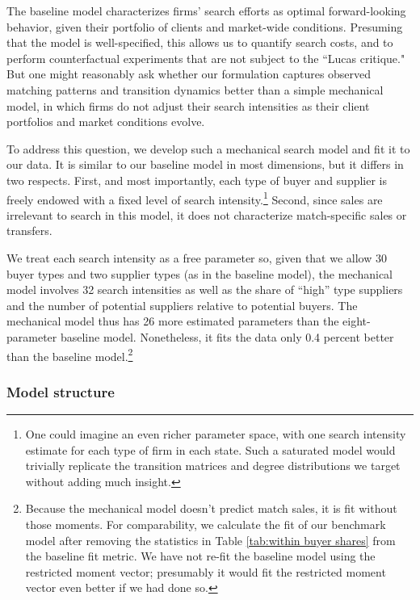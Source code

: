 \documentclass[12pt]{article} \usepackage{amsmath,amssymb,amsthm,geometry,graphicx,setspace,algorithm,algpseudocode,float}
\begin{document}
 The baseline model characterizes firms' search efforts as optimal forward-looking behavior, given their portfolio of clients and market-wide conditions. Presuming that the model is well-specified, this allows us to quantify search costs, and to perform counterfactual experiments that are not subject to the ``Lucas critique." But one might reasonably ask whether our formulation captures observed matching patterns and transition dynamics better than a simple mechanical model, in which firms do not adjust their search intensities as their client portfolios and market conditions evolve.  
\par
To address this question, we develop such a mechanical search model and fit it to our data.  It is similar to our baseline model in most dimensions, but it differs in two respects. First, and most importantly, each type of buyer and supplier is freely endowed with a fixed level of search intensity.\footnote{One could imagine an even richer parameter space, with one search intensity estimate for each type of firm in each state.  Such a saturated model would trivially replicate the transition matrices and degree distributions we target without adding much insight.\medskip} Second, since sales are irrelevant to search in this model, it does not characterize match-specific sales or transfers. 
\par
We treat each search intensity as a free parameter so, given that we allow $30$ buyer types and two supplier types (as in the baseline model), the mechanical model involves 32 search intensities as well as the share of ``high'' type suppliers and the number of potential suppliers relative to potential buyers.  The mechanical model thus has 26 more estimated parameters than the eight-parameter baseline model. Nonetheless, it fits the data only 0.4 percent better than the baseline model.\footnote{Because the mechanical model doesn't predict match sales, it is fit without those moments. For comparability, we calculate the fit of our benchmark model after removing the statistics in Table \ref{tab:within buyer shares} from the baseline fit metric. We have not re-fit the baseline model using the restricted moment vector; presumably it would fit the restricted moment vector even better if we had done so.\medskip}

\subsubsection{Model structure}
\end{document}
